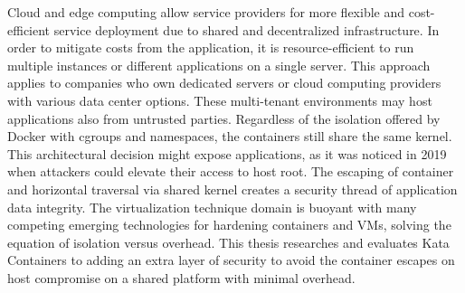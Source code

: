 Cloud and edge computing allow service providers for more flexible and cost-efficient service deployment due to shared and decentralized infrastructure. In order to mitigate costs from the application, it is resource-efficient to run multiple instances or different applications on a single server. This approach applies to companies who own dedicated servers or cloud computing providers with various data center options. These multi-tenant environments may host applications also from untrusted parties. Regardless of the isolation offered by Docker with cgroups and namespaces, the containers still share the same kernel. This architectural decision might expose applications, as it was noticed in 2019 \cite{CVE-2020-14386}\cite{CVE-2019-5736} when attackers could elevate their access to host root. The escaping of container and horizontal traversal via shared kernel creates a security thread of application data integrity. The virtualization technique domain is buoyant with many competing emerging technologies for hardening containers and VMs, solving the equation of isolation versus overhead. This thesis researches and evaluates Kata Containers to adding an extra layer of security to avoid the container escapes on host compromise on a shared platform with minimal overhead. \cite{EdgeComputing5G}






